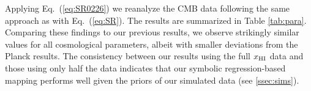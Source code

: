 Applying Eq.~(\ref{eq:SR0226}) we reanalyze the CMB data following the
same approach as with Eq.~(\ref{eq:SR}).
The results are summarized in Table \ref{tab:para}.
Comparing these findings to our previous results, we observe strikingly
similar values for all cosmological parameters, albeit with smaller
deviations from the Planck results.
The consistency between our results using the full $x_{\mathrm{HI}}$ data and
those using only half the data indicates that our symbolic
regression-based mapping performs well given the priors of our simulated
data (see \ref{ssec:sims}).
